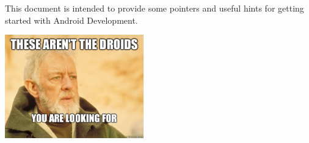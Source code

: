 \documentclass[11pt,letterpaper]{article}
\begin{document}
{} \vspace{2em}

This document is intended to provide some pointers and useful hints for getting started with Android Development. 

{
\centering
\includegraphics[width=6cm]{thesearentthedroidsyouarelookingfor}\\ 
}
\end{document}
